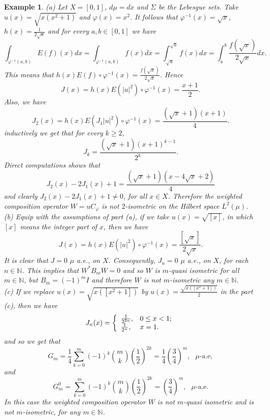 \documentclass{amsart}
\newtheorem{exam}[thm]{Example}
\theoremstyle{definition}\newtheorem{defn}[thm]{Definition}
\theoremstyle{remark}
\numberwithin{equation}{section}
\begin{document}
\begin{exam} (a) Let $X=[0, 1]$, $d\mu=dx$ and $\Sigma$
be the Lebesgue sets. Take $u(x)=\sqrt{x(x^2+1)}$ and $\varphi(x)=x^2$. 
 It follows that
$\varphi^{-1}(x)=\sqrt{x}$, $h(x)=\frac{1}{2\sqrt{x}}$ and for every $a,b\in [0,1]$ we have 
 $$\int_{\varphi^{-1}(a,b)}E(f)(x)dx=\int_{\varphi^{-1}(a,b)}f(x)dx=\int_{\sqrt{a}}^{\sqrt{b}}f(x)dx=\int_{a}^{b}\frac{f(\sqrt{x})}{2\sqrt{x}}dx.$$
 This means that $h(x)E(f)\circ\varphi^{-1}(x)=\frac{f(\sqrt{x})}{2\sqrt{x}}$. Hence 
 $$J(x)=h(x)E(|u|^2)\circ\varphi^{-1}(x)=\frac{x+1}{2}.$$
 Also, we have 
 $$J_2(x)=h(x)E(J_1|u|^2)\circ\varphi^{-1}(x)=\frac{(\sqrt{x}+1)(x+1)}{4}.$$
 inductively we get that for every $k\geq 2$, 
 $$J_k=\frac{(\sqrt{x}+1)(x+1)^{k-1}}{2^k}.$$
 Direct computations shows that 
 $$J_2(x)-2J_1(x)+1= \frac{(\sqrt{x}+1)(x-4\sqrt{x}+2)}{4}$$
 and clearly $J_2(x)-2J_1(x)+1\neq 0$, for all $x\in X$.
 Therefore the weighted composition operator $W=uC_{\varphi}$ is not $2$-isometric on the Hilbert space $L^2(\mu)$.\\
 (b) 
 Equip with the assumptions of part (a), if we take $u(x)=\sqrt{[x]}$, in which $[x]$ means the integer part of $x$, then we have 
  $$J(x)=h(x)E(|u|^2)\circ\varphi^{-1}(x)=\frac{[\sqrt{x} ]}{2\sqrt{x}}.$$
  It is clear that $J=0$  $\mu$ a.e., on $X$. Consequently, $J_n=0$  $\mu$ a.e., on $X$, for each $n\in \mathbb{N}$. This implies that $W^*B_mW=0$ and so $W$ is $m$-quasi isometric for all $m\in \mathbb{N}$, but $B_m=(-1)^mI$ and therefore $W$ is not $m$-isometric any $m\in \mathbb{N}$.\\

(c) If we replace $u(x)=\sqrt{x([x^2+1])}$ by 
$u(x)=\frac{\sqrt{x([x^2+1])}}{2}$ in the part (c), then we have 
$$J_n(x)=\left\{
  \begin{array}{ll}
    \frac{1}{2^{2n}}, & \hbox{$0\leq x<1$;} \\
    \frac{1}{2^{n}}, & \hbox{$x=1$.}
  \end{array}
\right.$$
and so we get that 
$$G_m=\frac{1}{4}\sum_{k=0}^{m}(-1)^{k}\binom{m}{k}(\frac{1}{2})^{2k}=\frac{1}{4}(\frac{3}{4})^m,\ \ \ \text{$\mu$-a.e},$$
and 
$$G^0_m=\sum_{k=0}^{m}(-1)^{k}\binom{m}{k}(\frac{1}{2})^{2k}=(\frac{3}{4})^m, \ \ \ \text{$\mu$-a.e}.$$
In this case the weighted composition operator $W$ is not $m$-quasi isometric and is not $m$-isometric, for any $m\in \mathbb{N}$.\\


\end{exam}
\end{document}
